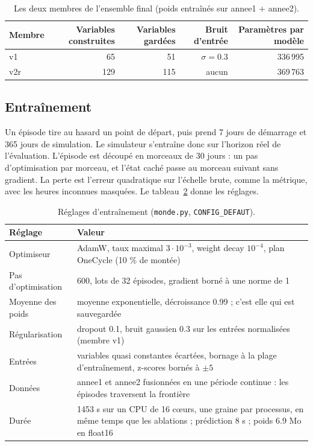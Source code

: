 \documentclass[11pt,a4paper]{article}
\newcommand{\code}[1]{\texttt{#1}}
\begin{document}
\begin{table}[!htb]
\centering\small
\caption{Les deux membres de l'ensemble final (poids entraînés sur annee1 + annee2).}
\label{tab:membres}
\begin{tabular}{l r r r r}
\toprule
Membre & Variables construites & Variables gardées & Bruit d'entrée & Paramètres par modèle \\
\midrule
v1  & 65  & 51  & $\sigma = 0.3$ & 336\,995 \\
v2r & 129 & 115 & aucun & 369\,763 \\
\bottomrule
\end{tabular}
\end{table}

\subsection{Entraînement}

Un épisode tire au hasard un point de départ, puis prend 7 jours de démarrage et 365 jours de simulation. Le simulateur s'entraîne donc sur l'horizon réel de l'évaluation. L'épisode est découpé en morceaux de 30 jours : un pas d'optimisation par morceau, et l'état caché passe au morceau suivant sans gradient. La perte est l'erreur quadratique sur l'échelle brute, comme la métrique, avec les heures inconnues masquées. Le tableau~\ref{tab:hyper} donne les réglages.

\begin{table}[!htb]
\centering\small
\caption{Réglages d'entraînement (\code{monde.py}, \code{CONFIG\_DEFAUT}).}
\label{tab:hyper}
\begin{tabularx}{\linewidth}{l X}
\toprule
Réglage & Valeur \\
\midrule
Optimiseur & AdamW, taux maximal $3\cdot10^{-3}$, weight decay $10^{-4}$, plan OneCycle (10 \% de montée) \\
Pas d'optimisation & 600, lots de 32 épisodes, gradient borné à une norme de 1 \\
Moyenne des poids & moyenne exponentielle, décroissance 0.99 ; c'est elle qui est sauvegardée \\
Régularisation & dropout 0.1, bruit gaussien 0.3 sur les entrées normalisées (membre v1) \\
Entrées & variables quasi constantes écartées, bornage à la plage d'entraînement, z-scores bornés à $\pm 5$ \\
Données & annee1 et annee2 fusionnées en une période continue : les épisodes traversent la frontière \\
Durée & 1453 s sur un CPU de 16 cœurs, une graine par processus, en même temps que les ablations ; prédiction 8 s ; poids 6.9 Mo en float16 \\
\bottomrule
\end{tabularx}
\end{table}
\end{document}
